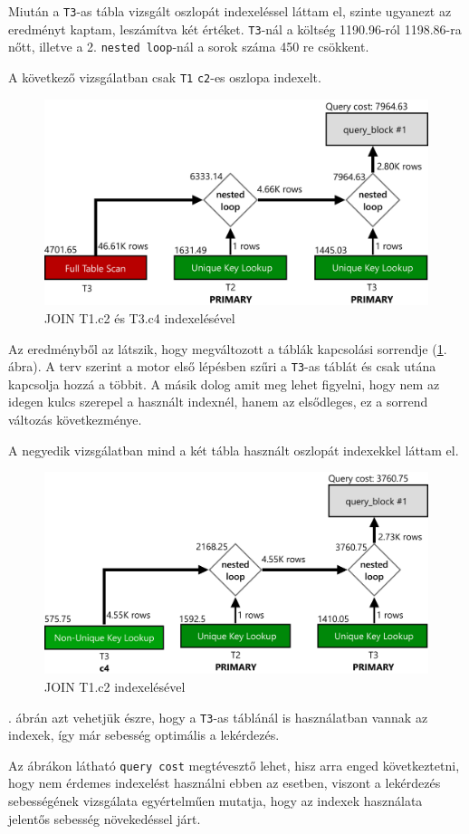 Miután a \texttt{T3}-as tábla vizsgált oszlopát indexeléssel láttam el, szinte ugyanezt az eredményt kaptam, leszámítva két értéket. \texttt{T3}-nál a költség 1190.96-ról 1198.86-ra nőtt, illetve a 2. \texttt{nested loop}-nál a sorok száma 450 re csökkent.

\newpage

A következő vizsgálatban csak \texttt{T1} \texttt{c2}-es oszlopa indexelt.

\begin{figure}[h!]
\centering
\includegraphics[width=14cm]{images/explain/3-2.png}
\caption{JOIN T1.c2 és T3.c4 indexelésével}
\label{fig:explain_3_2}
\end{figure}

Az eredményből az látszik, hogy megváltozott a táblák kapcsolási sorrendje (\ref{fig:explain_3_2}. ábra). A terv szerint a motor első lépésben szűri a \texttt{T3}-as táblát és csak utána kapcsolja hozzá a többit. A másik dolog amit meg lehet figyelni, hogy nem az idegen kulcs szerepel a használt indexnél, hanem az elsődleges, ez a sorrend változás következménye.

A negyedik vizsgálatban mind a két tábla használt oszlopát indexekkel láttam el.

\begin{figure}[h!]
\centering
\includegraphics[width=14cm]{images/explain/3-3.png}
\caption{JOIN T1.c2 indexelésével}
\label{fig:explain_3_3}
\end{figure}

. ábrán azt vehetjük észre, hogy a \texttt{T3}-as táblánál is használatban vannak az indexek, így már sebesség optimális a lekérdezés.

Az ábrákon látható \texttt{query cost} megtévesztő lehet, hisz arra enged következtetni, hogy nem érdemes indexelést használni ebben az esetben, viszont a lekérdezés sebességének vizsgálata egyértelműen mutatja, hogy az indexek használata jelentős sebesség növekedéssel járt. 
